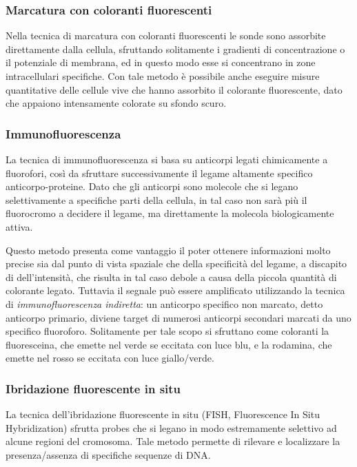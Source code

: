 \subsubsection*{Marcatura con coloranti fluorescenti}
Nella tecnica di marcatura con coloranti fluorescenti le sonde sono assorbite direttamente dalla cellula, sfruttando solitamente i gradienti di concentrazione o il potenziale di membrana, ed in questo modo esse si concentrano in zone intracellulari specifiche.
Con tale metodo è possibile anche eseguire misure quantitative delle cellule vive che hanno assorbito il colorante fluorescente, dato che appaiono intensamente colorate su sfondo scuro. 

\subsubsection*{Immunofluorescenza}
La tecnica di immunofluorescenza si basa su anticorpi legati chimicamente a fluorofori, così da sfruttare successivamente il legame altamente specifico anticorpo-proteine. 
Dato che gli anticorpi sono molecole che si legano selettivamente a specifiche parti della cellula, in tal caso non sarà più il fluorocromo a decidere il legame, ma direttamente la molecola biologicamente attiva.

Questo metodo presenta come vantaggio il poter ottenere informazioni molto precise sia dal punto di vista spaziale che della specificità del legame, a discapito di dell'intensità, che risulta in tal caso debole a causa della piccola quantità di colorante legato.
Tuttavia il segnale può essere amplificato utilizzando la tecnica di \textit{immunofluorescenza indiretta}: un anticorpo specifico non marcato, detto anticorpo primario, diviene target di numerosi anticorpi secondari marcati da uno specifico fluoroforo. 
Solitamente per tale scopo si sfruttano come coloranti la fluoresceina, che emette nel verde se eccitata con luce blu, e la rodamina, che emette nel rosso se eccitata con luce giallo/verde.

\subsubsection*{Ibridazione fluorescente in situ}
La tecnica dell'ibridazione fluorescente in situ (FISH, Fluorescence In Situ Hybridization) sfrutta probes che si legano in modo estremamente selettivo ad alcune regioni del cromosoma. 
Tale metodo permette di rilevare e localizzare la presenza/assenza di specifiche sequenze di DNA.

